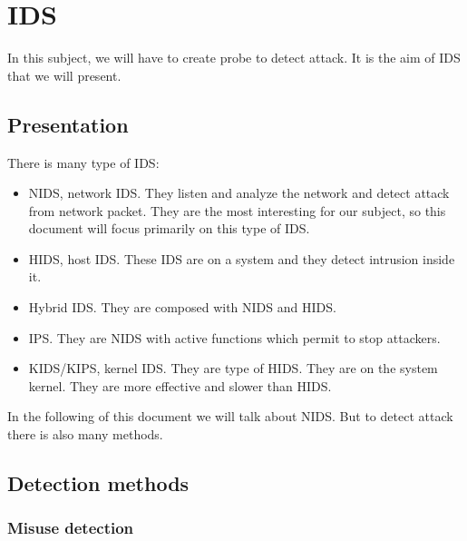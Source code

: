 
\chapter{IDS}

In this subject, we will have to create probe to detect attack. It is the aim of
IDS that we will present.

\section{Presentation}




There is many type of IDS:
\begin{itemize}
\item NIDS, network IDS. They listen and analyze the network and detect attack
  from network packet. They are the most interesting for our subject, so this
  document will focus primarily on this type of IDS.
\item HIDS, host IDS. These IDS are on a system and they detect intrusion inside
  it.
\item Hybrid IDS. They are composed with NIDS and HIDS.
\item IPS. They are NIDS with active functions which permit to stop attackers.
\item KIDS/KIPS, kernel IDS. They are type of HIDS. They are on the system
  kernel. They are more effective and slower than HIDS.
\end{itemize}

In the following of this document we will talk about NIDS. But to detect attack
there is also many methods.


\section{Detection methods}

\subsection{Misuse detection}

